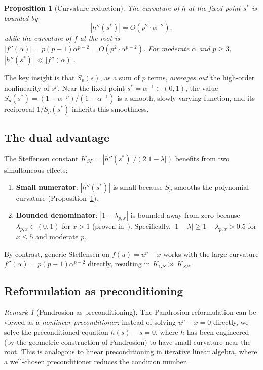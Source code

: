 \documentclass[10pt,a4paper,oneside]{book}
\newtheorem{proposition}[theorem]{Proposition}
\theoremstyle{definition}
\theoremstyle{remark}
\newtheorem{remark}[theorem]{Remark}
\begin{document}
\begin{proposition}[Curvature reduction]
\label{prop:curvature}
The curvature of $h$ at the fixed point $s^*$ is bounded by
\begin{equation}
  \label{eq:curvature_bound}
  |h''(s^*)| = O(p^2 \cdot \alpha^{-2}),
\end{equation}
while the curvature of $f$ at the root is $|f''(\alpha)| = p(p-1)\alpha^{p-2} = O(p^2 \cdot \alpha^{p-2})$.  For moderate $\alpha$ and $p \geq 3$, $|h''(s^*)| \ll |f''(\alpha)|$.
\end{proposition}

The key insight is that $S_p(s)$, as a sum of $p$ terms, \emph{averages out} the high-order nonlinearity of $s^p$.  Near the fixed point $s^* = \alpha^{-1} \in (0,1)$, the value $S_p(s^*) = (1 - \alpha^{-p})/(1 - \alpha^{-1})$ is a smooth, slowly-varying function, and its reciprocal $1/S_p(s^*)$ inherits this smoothness.

\subsection{The dual advantage}

The Steffensen constant $K_{SP} = |h''(s^*)|/(2|1-\lambda|)$ benefits from two simultaneous effects:

\begin{enumerate}
  \item \textbf{Small numerator}: $|h''(s^*)|$ is small because $S_p$ smooths the polynomial curvature (Proposition~\ref{prop:curvature}).
  \item \textbf{Bounded denominator}: $|1 - \lambda_{p,x}|$ is bounded away from zero because $\lambda_{p,x} \in (0,1)$ for $x > 1$ (proven in~\cite{besevic2026}).  Specifically, $|1 - \lambda| \geq 1 - \lambda_{p,x} > 0.5$ for $x \leq 5$ and moderate $p$.
\end{enumerate}

By contrast, generic Steffensen on $f(u) = u^p - x$ works with the large curvature $f''(\alpha) = p(p-1)\alpha^{p-2}$ directly, resulting in $K_{GS} \gg K_{SP}$.

\subsection{Reformulation as preconditioning}

\begin{remark}[Pandrosion as preconditioning]
The Pandrosion reformulation can be viewed as a \emph{nonlinear preconditioner}: instead of solving $u^p - x = 0$ directly, we solve the preconditioned equation $h(s) - s = 0$, where $h$ has been engineered (by the geometric construction of Pandrosion) to have small curvature near the root.  This is analogous to linear preconditioning in iterative linear algebra, where a well-chosen preconditioner reduces the condition number.
\end{remark}
\end{document}
